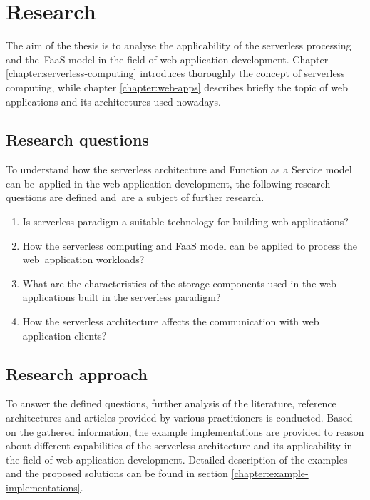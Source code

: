 \section{Research}

The aim of the thesis is to analyse the applicability of the serverless processing and the~FaaS model in the field of web application development. Chapter \ref{chapter:serverless-computing} introduces thoroughly the concept of serverless computing, while chapter \ref{chapter:web-apps} describes briefly the topic of web applications and its architectures used nowadays. 

\subsection{Research questions} \label{section:research-questions}

To understand how the serverless architecture and Function as a Service model can be~applied in the web application development, the following research questions are defined and~are a subject of further research.

\begin{enumerate}
    \item Is serverless paradigm a suitable technology for building web applications?
    \item How the serverless computing and FaaS model can be applied to process the web~application workloads?
    \item What are the characteristics of the storage components used in the web applications built in the serverless paradigm?
    \item How the serverless architecture affects the communication with web application clients?
\end{enumerate}

\subsection{Research approach} \label{section:research-approach}

To answer the defined questions, further analysis of the literature, reference architectures and articles provided by various practitioners is conducted.
Based on the gathered information, the example implementations are provided to reason about different capabilities of the serverless architecture and its applicability in the field of web application development.
Detailed description of the examples and the proposed solutions can be found in section \ref{chapter:example-implementations}.

